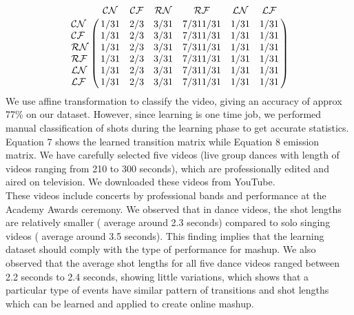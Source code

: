 \documentclass{sig-alternate}
\begin{document}
{{{$$
\bordermatrix{~ & \mathcal{CN} & \mathcal{CF}& \mathcal{RN}& \mathcal{RF}& \mathcal{LN}&\mathcal{LF} \cr
  \mathcal{CN} & 1/31 & 2/3& 3/31 &7/311/31&1/31&1/31\cr
  \mathcal{CF} &1/31 & 2/3& 3/31 &7/311/31&1/31&1/31 \cr
  \mathcal{RN} &1/31 & 2/3& 3/31 &7/311/31&1/31&1/31\cr
  \mathcal{RF} &1/31 & 2/3& 3/31 &7/311/31&1/31&1/31\cr
  \mathcal{LN} &1/31 & 2/3& 3/31 &7/311/31&1/31&1/31 \cr
  \mathcal{LF} &1/31 & 2/3& 3/31 &7/311/31&1/31&1/31 \cr
  }
$$
We use affine transformation to classify the video, giving an accuracy
of approx 77\% on our dataset. However, since learning is one
time job, we performed manual classification of shots during the
learning phase to get accurate statistics. Equation 7 shows the
learned transition matrix while Equation 8 emission matrix. We
have carefully selected five videos (live group dances with length
of videos ranging from 210 to 300 seconds), which are professionally
edited and aired on television. We downloaded these videos
from YouTube.\\
These videos include concerts by professional bands and performance
at the Academy Awards ceremony. We observed that
in dance videos, the shot lengths are relatively smaller ( average
around 2.3 seconds) compared to solo singing videos ( average
around 3.5 seconds). This finding implies that the learning dataset
should comply with the type of performance for mashup. We also
observed that the average shot lengths for all five dance videos
ranged between 2.2 seconds to 2.4 seconds, showing little variations,
which shows that a particular type of events have similar
pattern of transitions and shot lengths which can be learned and
applied to create online mashup.\\

}}}
\end{document}
